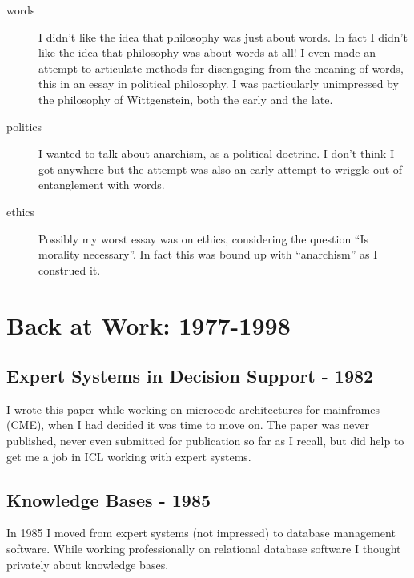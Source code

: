 \documentclass[10pt,titlepage]{book}
\begin{document}
\begin{description}

\item[words]
I didn't like the idea that philosophy was just about words.
In fact I didn't like the idea that philosophy was about words at all!
I even made an attempt to articulate methods for disengaging from the meaning of words, this in an essay in political philosophy.
I was particularly unimpressed by the philosophy of Wittgenstein, both the early and the late.

\item[politics]
I wanted to talk about anarchism, as a political doctrine.
I don't think I got anywhere but the attempt was also an early attempt to wriggle out of entanglement with words.

\item[ethics]
Possibly my worst essay was on ethics, considering the question ``Is morality necessary''.
In fact this was bound up with ``anarchism'' as I construed it.

\end{description}

\chapter{Back at Work: 1977-1998}

\section{Expert Systems in Decision Support - 1982}\label{1982}

I wrote this paper while working on microcode architectures for mainframes (CME), when I had decided it was time to move on.
The paper was never published, never even submitted for publication so far as I recall, but did help to get me a job in ICL working with expert systems.

\section{Knowledge Bases - 1985}

In 1985 I moved from expert systems (not impressed) to database management software.
While working professionally on relational database software I thought privately about knowledge bases.
\end{document}
